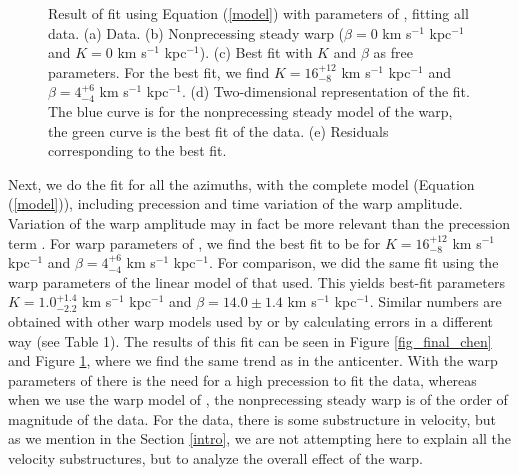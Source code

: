 \documentclass[twocolumn]{aastex63}
\begin{document}
\begin{figure}

	
	\caption{Result of fit using Equation (\ref{model}) with parameters of \cite{zofi}, fitting all data. (a) Data. (b) Nonprecessing steady warp ($\beta=0$ km s$^{-1}$ kpc$^{-1}$ and $K=0$ km s$^{-1}$ kpc$^{-1}$). (c) Best fit with $K$ and $\beta$ as free parameters. For the best fit, we find $K=16^{+12}_{-8}$ km s$^{-1}$ kpc$^{-1}$ and $\beta=4^{+6}_{-4}$ km s$^{-1}$ kpc$^{-1}$. (d) Two-dimensional representation of the fit. The blue curve is for the nonprecessing steady model of the warp, the green curve is the best fit of the data. (e) Residuals corresponding to the best fit.}
		\label{fig_final_zofi}
\end{figure}

Next, we do the fit for all the azimuths, with the complete model (Equation (\ref{model})), including precession and time variation of the warp amplitude. Variation of the warp amplitude may in fact be more relevant than the precession term \citep{martin_ampl,martin_new}. For warp parameters of \cite{zofi}, we find the best fit to be for $K=16^{+12}_{-8}$ km s$^{-1}$ kpc$^{-1}$ and $\beta=4^{+6}_{-4}$ km s$^{-1}$ kpc$^{-1}$. For comparison, we did the same fit using the warp parameters of the linear model of \cite{chen} that  used. This yields best-fit parameters $K=1.0^{+1.4}_{-2.2}$ km s$^{-1}$ kpc$^{-1}$ and $\beta=14.0 \pm 1.4$ km s$^{-1}$ kpc$^{-1}$. Similar numbers are obtained with other warp models used by  or by calculating errors in a different way (see Table 1). The results of this fit can be seen in Figure \ref{fig_final_chen} and Figure \ref{fig_final_zofi}, where we find the same trend as in the anticenter. With the warp parameters of \cite{chen} there is the need for a high precession to fit the data, whereas when we use the warp model of \cite{zofi}, the nonprecessing steady warp is of the order of magnitude of the data. For the data, there is some substructure in velocity, but as we mention in the Section \ref{intro}, we are not attempting here to explain all the velocity substructures, but to analyze the overall effect of the warp. 
\end{document}
